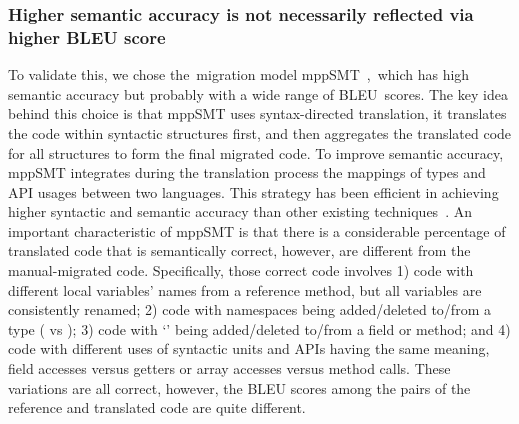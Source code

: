 \subsubsection{{\bf Higher semantic accuracy is not necessarily reflected via higher BLEU score}}
%
%
To validate this, we chose the~migration model
mppSMT~\cite{ase15},~which has high semantic accuracy but probably
with a wide range of BLEU~scores.  The key idea behind this choice is
that mppSMT uses syntax-directed translation, \ie it translates the
code within syntactic structures first, and then aggregates the
translated code for all structures to form the final migrated code. To
improve semantic accuracy, mppSMT integrates during the translation
process the mappings of types and API usages between two
languages. This strategy has been efficient in achieving higher
syntactic and semantic accuracy than other existing
techniques~\cite{ase15}. An important characteristic of mppSMT is that
there is a considerable percentage of translated code that is
semantically correct, however, are different from the manual-migrated
code. Specifically, those correct code involves 1) code with different
local variables' names from a reference method, but all variables are
consistently renamed; 2) code with namespaces being added/deleted
to/from a type (\eg {} vs ); 3) code with
`' being added/deleted to/from a field or method; and 4)
code with different uses of syntactic units and APIs having the same
meaning, \eg field accesses versus getters or array accesses versus
method calls. These variations are all correct, however, the BLEU
scores among the pairs of the reference and translated code are quite
different.




%

